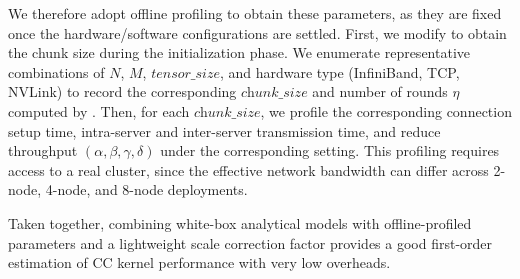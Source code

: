 We therefore adopt offline profiling to obtain these parameters, as they are fixed once the hardware/software configurations are settled. First, we modify \nccl to obtain the chunk size during the initialization phase. We enumerate representative combinations of $N$, $M$, $\textit{tensor\_size}$, and hardware type (InfiniBand, TCP, NVLink) to record the corresponding $\textit{chunk\_size}$ and number of rounds $\eta$ computed by \nccl. Then, for each $\textit{chunk\_size}$, we profile the corresponding connection setup time, intra-server and inter-server transmission time, and reduce throughput $(\alpha,\beta,\gamma,\delta)$ under the corresponding setting. 
This profiling requires access to a real cluster, since the effective network bandwidth can differ across 2-node, 4-node, and 8-node deployments. 


Taken together, combining white-box analytical models with offline-profiled parameters and a lightweight scale correction factor provides a good first-order estimation of CC kernel performance with very low overheads.